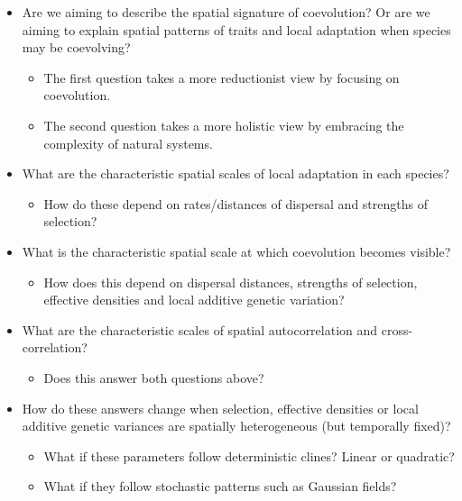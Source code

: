 \documentclass{article}
\begin{document}
\begin{itemize}
\tightlist
\item
  Are we aiming to describe the spatial signature of coevolution? Or are
  we aiming to explain spatial patterns of traits and local adaptation
  when species may be coevolving?

  \begin{itemize}
  \tightlist
  \item
    The first question takes a more reductionist view by focusing on
    coevolution.
  \item
    The second question takes a more holistic view by embracing the
    complexity of natural systems.
  \end{itemize}
\item
  What are the characteristic spatial scales of local adaptation in each
  species?

  \begin{itemize}
  \tightlist
  \item
    How do these depend on rates/distances of dispersal and strengths of
    selection?
  \end{itemize}
\item
  What is the characteristic spatial scale at which coevolution becomes
  visible?

  \begin{itemize}
  \tightlist
  \item
    How does this depend on dispersal distances, strengths of selection,
    effective densities and local additive genetic variation?
  \end{itemize}
\item
  What are the characteristic scales of spatial autocorrelation and
  cross-correlation?

  \begin{itemize}
  \tightlist
  \item
    Does this answer both questions above?
  \end{itemize}
\item
  How do these answers change when selection, effective densities or
  local additive genetic variances are spatially heterogeneous (but
  temporally fixed)?

  \begin{itemize}
  \tightlist
  \item
    What if these parameters follow deterministic clines? Linear or
    quadratic?
  \item
    What if they follow stochastic patterns such as Gaussian fields?


\end{itemize}
\end{itemize}
\end{document}
